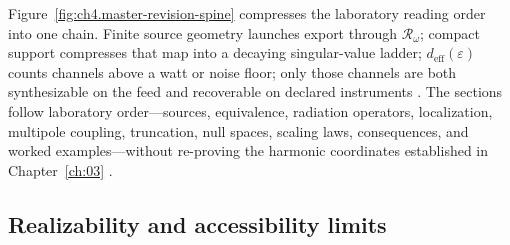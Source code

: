 Figure~\ref{fig:ch4.master-revision-spine} compresses the laboratory reading order into one chain. Finite source geometry launches export through $\mathcal{R}_\omega$; compact support compresses that map into a decaying singular-value ladder; $d_{\mathrm{eff}}(\varepsilon)$ counts channels above a watt or noise floor; only those channels are both synthesizable on the feed and recoverable on declared instruments \cite{maxwell1873}. The sections follow laboratory order---sources, equivalence, radiation operators, localization, multipole coupling, truncation, null spaces, scaling laws, consequences, and worked examples---without re-proving the harmonic coordinates established in Chapter~\ref{ch:03} \cite{stratton1941}.

\subsection{Realizability and accessibility limits}
\label{sec:ch401}


